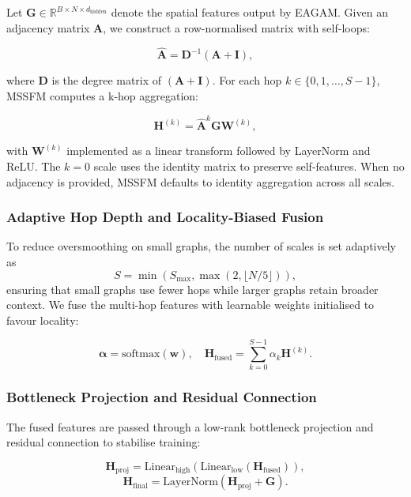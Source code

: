 \documentclass[a4paper,fleqn]{cas-dc}
\begin{document}
Let $\mathbf{G} \in \mathbb{R}^{B \times N \times d_{\text{hidden}}}$ denote the spatial features output by EAGAM. Given an adjacency matrix $\mathbf{A}$, we construct a row-normalised matrix with self-loops:

\begin{equation}
\mathbf{\hat{A}} = \mathbf{D}^{-1}(\mathbf{A} + \mathbf{I}),
\end{equation}

where $\mathbf{D}$ is the degree matrix of $(\mathbf{A} + \mathbf{I})$. For each hop $k \in \{0, 1, \ldots, S-1\}$, MSSFM computes a k-hop aggregation:

\begin{equation}
\mathbf{H}^{(k)} = \mathbf{\hat{A}}^{k}\mathbf{G}\mathbf{W}^{(k)},
\end{equation}

with $\mathbf{W}^{(k)}$ implemented as a linear transform followed by LayerNorm and ReLU. The $k=0$ scale uses the identity matrix to preserve self-features. When no adjacency is provided, MSSFM defaults to identity aggregation across all scales.

\subsubsection{Adaptive Hop Depth and Locality-Biased Fusion}

To reduce oversmoothing on small graphs, the number of scales is set adaptively as
\begin{equation}
S = \min(S_{\max}, \max(2, \lfloor N/5 \rfloor)),
\end{equation}
ensuring that small graphs use fewer hops while larger graphs retain broader context. We fuse the multi-hop features with learnable weights initialised to favour locality:

\begin{equation}
\boldsymbol{\alpha} = \text{softmax}(\mathbf{w}), \quad
\mathbf{H}_{\text{fused}} = \sum_{k=0}^{S-1} \alpha_k \mathbf{H}^{(k)}.
\end{equation}

\subsubsection{Bottleneck Projection and Residual Connection}

The fused features are passed through a low-rank bottleneck projection and residual connection to stabilise training:

\begin{equation}
\mathbf{H}_{\text{proj}} = \text{Linear}_{\text{high}}(\text{Linear}_{\text{low}}(\mathbf{H}_{\text{fused}})),
\end{equation}
\begin{equation}
\mathbf{H}_{\text{final}} = \text{LayerNorm}(\mathbf{H}_{\text{proj}} + \mathbf{G}).
\end{equation}
\end{document}
